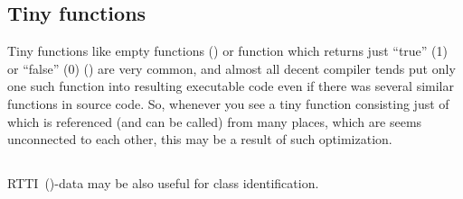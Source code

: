 \subsection{Tiny functions}

Tiny functions like empty functions ()
or function which returns just ``true'' (1) or ``false'' (0) () are very common,
and almost all decent compiler tends put only one such function into resulting executable code even if there was several
similar functions in source code.
So, whenever you see a tiny function consisting just of 
which is referenced (and can be called) from many places,
which are seems unconnected to each other, this may be a result of such optimization.%

\subsection{\Cpp}

\ac{RTTI}~()-data may be also useful for \Cpp class identification.





